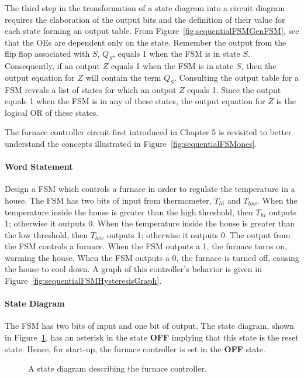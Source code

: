 The third step in the transformation of a state diagram into a circuit
diagram requires the elaboration of the output bits and the definition of their
value for each state forming an output table.  From Figure~\ref{fig:sequentialFSMGenFSM}, 
see that the OEs are dependent only on the state.  Remember the
output from the flip flop associated with $S$, $Q_S$, equals 1 when the 
FSM is in state $S$.  Consequently, if an output $Z$ equals 1 when the 
FSM is in state $S$, then the output equation for $Z$ will contain the
term $Q_S$.  Consulting the output table for a FSM reveals a list
of states for which an output $Z$ equals 1.  Since the output equals
1 when the FSM is in any of these states, the output equation for $Z$
is the logical OR of these states.

The furnace controller circuit first introduced in Chapter 5 is 
revisited to better understand the concepts illustrated in 
Figure~\ref{fig:sequentialFSMones}.



\paragraph{Word Statement} 
Design a FSM which controls a furnace in order to regulate the 
temperature in a house.  The FSM has two bits of input from thermometer,
$T_{hi}$ and $T_{low}$.  When the temperature inside the house 
is greater than the high threshold, then $T_{hi}$ outputs 1; otherwise 
it outputs 0.  When the temperature inside the house is greater than 
the low threshold, then $T_{low}$ outputs 1; otherwise it outputs 0.  
The output from the FSM controls a furnace.  When the FSM outputs a 
1, the furnace turns on, warming the house.  When the FSM outputs a 0, 
the furnace is turned off, causing the house to cool down.  A graph
of this controller's behavior is given in Figure~\ref{fig:sequentialFSMHysteresisGraph}.

\paragraph{State Diagram}
The FSM has two bits of input and one bit of
output. The state diagram, shown in Figure~\ref{fig:sequentialFSMFurnaceSD}, has
an asterisk in the state \textbf{ OFF} implying that this state is the reset state. 
Hence, for start-up, the furnace controller is set in the \textbf{ OFF}
state.

\begin{figure}[ht]
\caption{A state diagram describing the furnace controller.}
\label{fig:sequentialFSMFurnaceSD}
\end{figure}

